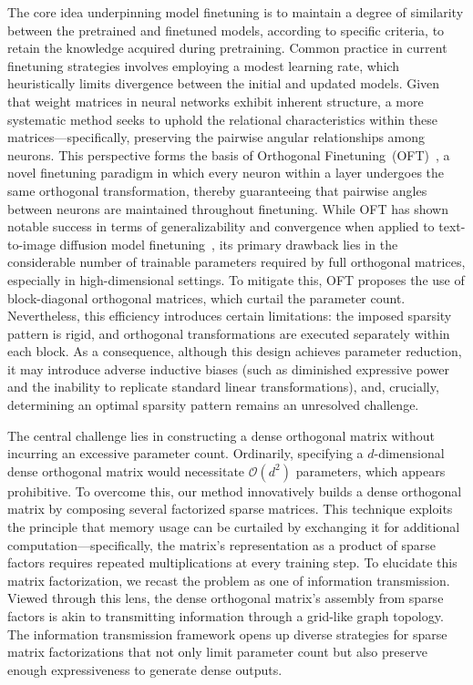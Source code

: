 The core idea underpinning model finetuning is to maintain a degree of similarity between the pretrained and finetuned models, according to specific criteria, to retain the knowledge acquired during pretraining. Common practice in current finetuning strategies involves employing a modest learning rate, which heuristically limits divergence between the initial and updated models. Given that weight matrices in neural networks exhibit inherent structure, a more systematic method seeks to uphold the relational characteristics within these matrices—specifically, preserving the pairwise angular relationships among neurons. This perspective forms the basis of Orthogonal Finetuning~(OFT)~\cite{qiu2023controlling}, a novel finetuning paradigm in which every neuron within a layer undergoes the same orthogonal transformation, thereby guaranteeing that pairwise angles between neurons are maintained throughout finetuning. While OFT has shown notable success in terms of generalizability and convergence when applied to text-to-image diffusion model finetuning~\cite{qiu2023controlling}, its primary drawback lies in the considerable number of trainable parameters required by full orthogonal matrices, especially in high-dimensional settings. To mitigate this, OFT proposes the use of block-diagonal orthogonal matrices, which curtail the parameter count. Nevertheless, this efficiency introduces certain limitations: the imposed sparsity pattern is rigid, and orthogonal transformations are executed separately within each block. As a consequence, although this design achieves parameter reduction, it may introduce adverse inductive biases (such as diminished expressive power and the inability to replicate standard linear transformations), and, crucially, determining an optimal sparsity pattern remains an unresolved challenge.

The central challenge lies in constructing a dense orthogonal matrix without incurring an excessive parameter count. Ordinarily, specifying a $d$-dimensional dense orthogonal matrix would necessitate $\mathcal{O}(d^2)$ parameters, which appears prohibitive. To overcome this, our method innovatively builds a dense orthogonal matrix by composing several factorized sparse matrices. This technique exploits the principle that memory usage can be curtailed by exchanging it for additional computation—specifically, the matrix's representation as a product of sparse factors requires repeated multiplications at every training step. To elucidate this matrix factorization, we recast the problem as one of information transmission. Viewed through this lens, the dense orthogonal matrix’s assembly from sparse factors is akin to transmitting information through a grid-like graph topology. The information transmission framework opens up diverse strategies for sparse matrix factorizations that not only limit parameter count but also preserve enough expressiveness to generate dense outputs.

